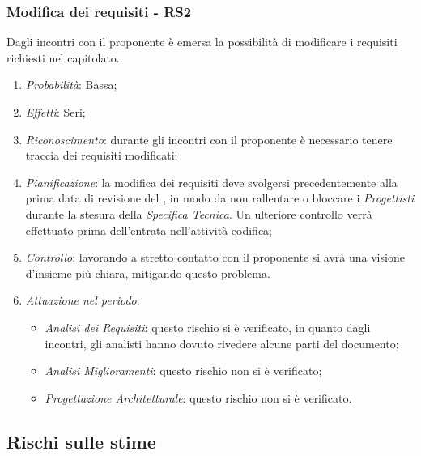 \subsubsection{Modifica dei requisiti - RS2}
Dagli incontri con il proponente \`e emersa la possibilit\`a di modificare i requisiti richiesti nel capitolato.
\begin{enumerate}
\item \textit{Probabilit\`a}: Bassa;
\item \textit{Effetti}: Seri;
\item \textit{Riconoscimento}: durante gli incontri con il proponente è necessario tenere traccia dei requisiti modificati;
\item \textit{Pianificazione}: la modifica dei requisiti deve svolgersi precedentemente alla prima data di revisione del , in modo da non rallentare o bloccare i \textit{Progettisti} durante la stesura della \textit{Specifica Tecnica}. Un ulteriore controllo verr\`a effettuato prima dell'entrata nell'attivit\`a codifica;
\item \textit{Controllo}: lavorando a stretto contatto con il proponente si avr\`a una visione d'insieme pi\`u chiara, mitigando questo problema.
\item \textit{Attuazione nel periodo}: 
	\begin{itemize}
	\item \textit{Analisi dei Requisiti}: questo rischio si è verificato, in quanto dagli incontri, gli analisti hanno dovuto rivedere alcune parti del documento;
	\item \textit{Analisi Miglioramenti}: questo rischio non si è verificato;
	\item \textit{Progettazione Architetturale}: questo rischio non si è verificato.
	\end{itemize}
\end{enumerate}

\subsection{Rischi sulle stime}
